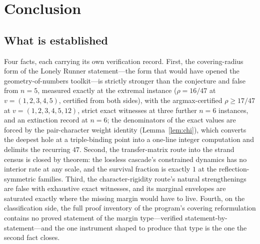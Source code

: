 \documentclass[11pt,a4paper]{article}
\numberwithin{equation}{section}
\theoremstyle{plain}
\theoremstyle{definition}
\theoremstyle{remark}
\begin{document}

\section{Conclusion}\label{sec:concl}

\subsection{What is established}

Four facts, each carrying its own verification record. First, the
covering-radius form of the Lonely Runner statement---the form that
would have opened the geometry-of-numbers toolkit---is strictly stronger
than the conjecture and false from $n=5$, measured exactly at the
extremal instance ($\rho=16/47$ at $v=(1,2,3,4,5)$, certified from both
sides), with the argmax-certified $\rho\ge17/47$ at
$v=(1,2,3,4,5,12)$, strict exact
witnesses at three further $n=6$ instances, and an extinction record at
$n=6$; the denominators of the exact values are forced by the
pair-character weight identity (Lemma~\ref{lem:chi}), which converts
the deepest hole at a triple-binding point into a one-line integer
computation and delimits the recurring $47$. Second, the
transfer-matrix route into the strand census is
closed by theorem: the lossless cascade's constrained dynamics has no
interior rate at any scale, and the survival fraction is exactly $1$ at
the reflection-symmetric families. Third, the character-rigidity route's
natural strengthenings are false with exhaustive exact witnesses, and
its marginal envelopes are saturated exactly where the missing margin
would have to live. Fourth, on the classification side, the full proof
inventory of the program's covering reformulation contains no proved
statement of the margin type---verified statement-by-statement---and the
one instrument shaped to produce that type is the one the second fact
closes.
\end{document}
